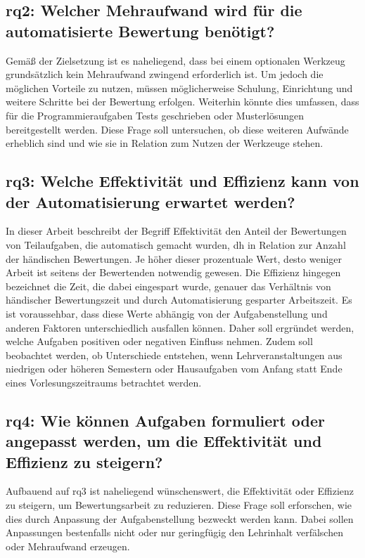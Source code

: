 \subsection[\acs{rq}2]{\ac{rq}2: Welcher Mehraufwand wird für die automatisierte Bewertung benötigt?}\label{subsec:rq2-additional-effort}

Gemäß der Zielsetzung ist es naheliegend, dass bei einem optionalen Werkzeug grundsätzlich kein Mehraufwand zwingend erforderlich ist.
Um jedoch die möglichen Vorteile zu nutzen, müssen möglicherweise Schulung, Einrichtung und weitere Schritte bei der Bewertung erfolgen.
Weiterhin könnte dies umfassen, dass für die Programmieraufgaben Tests geschrieben oder Musterlösungen bereitgestellt werden.
Diese Frage soll untersuchen, ob diese weiteren Aufwände erheblich sind und wie sie in Relation zum Nutzen der Werkzeuge stehen.

\subsection[\acs{rq}3]{\ac{rq}3: Welche Effektivität und Effizienz kann von der Automatisierung erwartet werden?}\label{subsec:rq3-effectivity-efficiency}

In dieser Arbeit beschreibt der Begriff Effektivität den Anteil der Bewertungen von Teilaufgaben, die automatisch gemacht wurden, \ac{dh} in Relation zur Anzahl der händischen Bewertungen.
Je höher dieser prozentuale Wert, desto weniger Arbeit ist seitens der Bewertenden notwendig gewesen.
Die Effizienz hingegen bezeichnet die Zeit, die dabei eingespart wurde, genauer das Verhältnis von händischer Bewertungszeit und durch Automatisierung gesparter Arbeitszeit.
Es ist voraussehbar, dass diese Werte abhängig von der Aufgabenstellung und anderen Faktoren unterschiedlich ausfallen können.
Daher soll ergründet werden, welche Aufgaben positiven oder negativen Einfluss nehmen.
Zudem soll beobachtet werden, ob Unterschiede entstehen, wenn Lehrveranstaltungen aus niedrigen oder höheren Semestern oder Hausaufgaben vom Anfang statt Ende eines Vorlesungszeitraums betrachtet werden.

\subsection[\acs{rq}4]{\ac{rq}4: Wie können Aufgaben formuliert oder angepasst werden, um die Effektivität und Effizienz zu steigern?}\label{subsec:rq4-improve-effectivity-efficiency}

Aufbauend auf \acs{rq}3 ist naheliegend wünschenswert, die Effektivität oder Effizienz zu steigern, um Bewertungsarbeit zu reduzieren.
Diese Frage soll erforschen, wie dies durch Anpassung der Aufgabenstellung bezweckt werden kann.
Dabei sollen Anpassungen bestenfalls nicht oder nur geringfügig den Lehrinhalt verfälschen oder Mehraufwand erzeugen.

